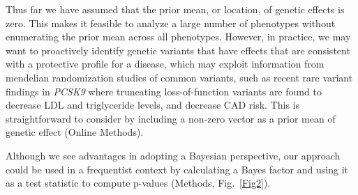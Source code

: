 \documentclass{nature}
\begin{document}
Thus far we have assumed that the prior mean, or location, of genetic effects is zero. This makes it feasible to analyze a large number of phenotypes without enumerating the prior mean across all phenotypes. However, in practice, we may want to proactively identify genetic variants that have effects that are consistent with a protective profile for a disease, which may exploit information from mendelian randomization studies of common variants, such as recent rare variant findings in {\it PCSK9} where truncating loss-of-function variants are found to decrease LDL and triglyceride levels, and decrease CAD risk\cite{cohen2005low,pcsk9,do2013common,cohorts2014loss}. This is straightforward to consider by including a non-zero vector as a prior mean of genetic effect (Online Methods).

Although we see advantages in adopting a Bayesian perspective, our approach could be used in a frequentist context by calculating a Bayes factor and using it as a test statistic to compute p-values (Methods, Fig.~\ref{Fig2}).
 
\end{document}
